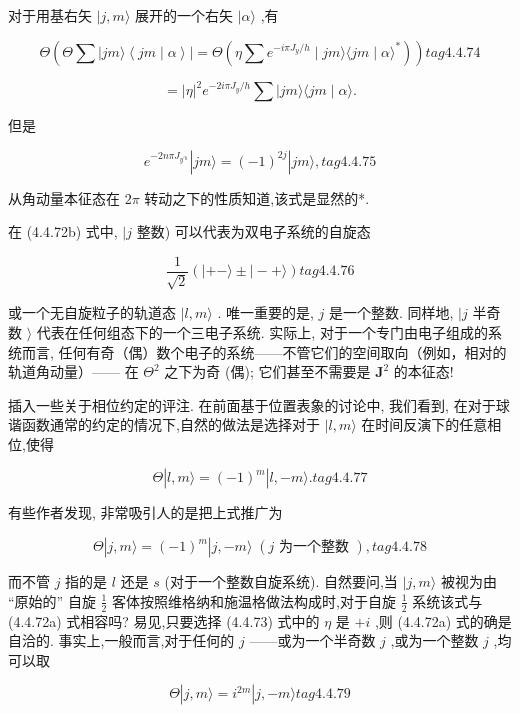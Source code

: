 对于用基右矢 $|j, m\rangle$ 展开的一个右矢 $|\alpha \rangle$ ,有

$$
\Theta \left( {\Theta \sum \left| {{jm}\rangle \left\langle {{jm} \mid \alpha }\right\rangle }\right| = \Theta \left( {\eta \sum {e}^{-{i\pi }{J}_{y}/h} \mid {jm}\rangle \langle {jm} \mid \alpha {\rangle }^{ * }}\right) }\right) tag{4. 4.74}
$$

$$
= {\left| \eta \right| }^{2}{e}^{-{2i\pi }{J}_{y}/h}\sum |{jm}\rangle \langle {jm} \mid \alpha \rangle .
$$

但是

$$
{e}^{-{2n\pi }{J}_{{y}^{\prime h}}}\left| {{jm}\rangle = {\left( -1\right) }^{2j}}\right| {jm}\rangle , tag{4. 4.75}
$$

从角动量本征态在 ${2\pi }$ 转动之下的性质知道,该式是显然的*.

在 (4.4.72b) 式中, $\mid j$ 整数) 可以代表为双电子系统的自旋态

$$
\frac{1}{\sqrt{2}}\left( {\left| {+ - \rangle \pm }\right| - + \rangle }\right) tag{4. 4.76}
$$

或一个无自旋粒子的轨道态 $|l, m\rangle$ . 唯一重要的是, $j$ 是一个整数. 同样地, $\mid j$ 半奇数 $\rangle$ 代表在任何组态下的一个三电子系统. 实际上, 对于一个专门由电子组成的系统而言, 任何有奇（偶）数个电子的系统——不管它们的空间取向（例如，相对的轨道角动量）—— 在 ${\Theta }^{2}$ 之下为奇 (偶); 它们甚至不需要是 ${\mathbf{J}}^{2}$ 的本征态!

插入一些关于相位约定的评注. 在前面基于位置表象的讨论中, 我们看到, 在对于球谐函数通常的约定的情况下,自然的做法是选择对于 $|l, m\rangle$ 在时间反演下的任意相位,使得

$$
\Theta \left| {l, m\rangle = {\left( -1\right) }^{m}}\right| l, - m\rangle . tag{4. 4.77}
$$

有些作者发现, 非常吸引人的是把上式推广为

$$
\Theta \left| {j, m\rangle = {\left( -1\right) }^{m}}\right| j, - m\rangle \;\left( {j\text{ 为一个整数 }}\right) , tag{4. 4.78}
$$

而不管 $j$ 指的是 $l$ 还是 $s$ (对于一个整数自旋系统). 自然要问,当 $|j, m\rangle$ 被视为由 “原始的” 自旋 $\frac{1}{2}$ 客体按照维格纳和施温格做法构成时,对于自旋 $\frac{1}{2}$ 系统该式与 (4.4.72a) 式相容吗? 易见,只要选择 (4.4.73) 式中的 $\eta$ 是 $+ i$ ,则 (4.4.72a) 式的确是自洽的. 事实上,一般而言,对于任何的 $j$ ——或为一个半奇数 $j$ ,或为一个整数 $j$ ,均可以取

$$
\Theta \left| {j, m\rangle = {i}^{2m}}\right| j, - m\rangle tag{4. 4.79}
$$


